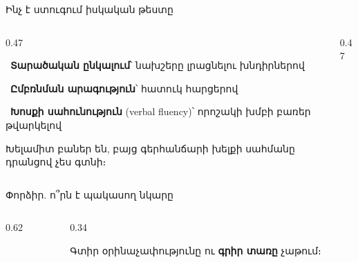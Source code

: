 \begin{frame}{Ինչ է ստուգում իսկական թեստը}
  \begin{columns}[T]
    \begin{column}{0.47\textwidth}
      \begin{card}
        \ \textbf{Տարածական ընկալում}՝ նախշերը լրացնելու խնդիրներով\par\smallskip
        \ \textbf{Ըմբռնման արագություն}՝ հատուկ հարցերով\par\smallskip
        \ \textbf{Խոսքի սահունություն} (verbal fluency)՝ որոշակի խմբի բառեր թվարկելով
      \end{card}
      \vspace{1mm}
      {\small Խելամիտ բաներ են, բայց գերհանճարի խելքի սահմանը դրանցով չես գտնի։\par}
    \end{column}
    \begin{column}{0.47\textwidth}
    \end{column}
  \end{columns}
\end{frame}

\begin{frame}{Փորձիր. ո՞րն է պակասող նկարը}
  \begin{columns}[c]
    \begin{column}{0.62\textwidth}
      \centering
      
    \end{column}
    \begin{column}{0.34\textwidth}
      \begin{tryit}
        Գտիր օրինաչափությունը ու \textbf{գրիր տառը} չաթում։
      \end{tryit}
    \end{column}
  \end{columns}
\end{frame}

